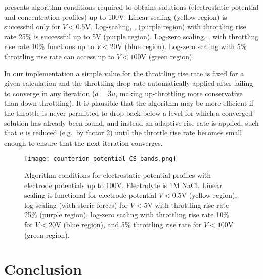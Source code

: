  presents algorithm conditions required
to obtains solutions (electrostatic potential and concentration profiles) up to
100V. Linear scaling (yellow region) is successful only for
$V<0.5$V. Log-scaling, , (purple region) with
throttling rise rate 25\% is successful up to 5V (purple
region). Log-zero scaling, , with throttling rise
rate 10\% functions up to $V<20$V (blue region). Log-zero scaling with
5\% throttling rise rate can access up to $V<100$V (green region).

In our  implementation a simple value for the throttling rise rate  is fixed for a given
calculation and the throttling drop rate automatically applied 
after failing to converge in any iteration
($d=3u$, making up-throttling more conservative than
down-throttling). It is plausible that the algorithm may be more
efficient if the throttle is never permitted to drop back below a
level for which a converged solution has already been found, and
instead an adaptive rise rate is applied, such that $u$ is reduced
(e.g.\ by factor 2) until the throttle rise rate becomes small enough to
ensure that the next iteration converges.

\begin{figure}
\centering
\texttt{[image: counterion\_potential\_CS\_bands.png]}
\caption{\label{fig_all_potential_high} Algorithm conditions for
  electrostatic potential profiles with electrode potentials up to
  100V. Electrolyte is 1M NaCl. Linear scaling is functional for
  electrode potential $V<0.5$V (yellow region), log scaling (with
  steric forces) for $V<5$V with throttling rise rate 25\% (purple
  region), log-zero scaling with throttling rise rate 10\% for $V<20$V
  (blue region), and 5\% throttling rise rate for $V<100$V (green
  region).  }
\end{figure}

\section{Conclusion}

